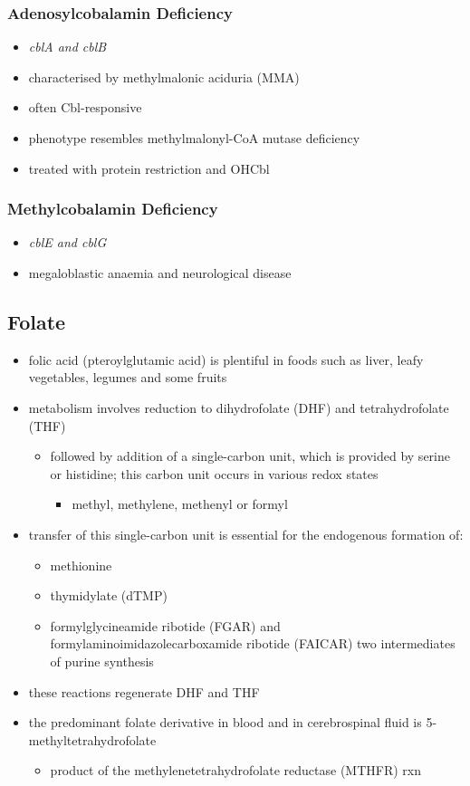 \documentclass{scrartcl}
\begin{document}
\subsubsection{Adenosylcobalamin Deficiency}
\label{sec:org4a7ae16}
\begin{itemize}
\item \emph{cblA and cblB}
\item characterised by methylmalonic aciduria (MMA)
\item often Cbl-responsive
\item phenotype resembles methylmalonyl-CoA mutase deficiency
\item treated with protein restriction and OHCbl
\end{itemize}

\subsubsection{Methylcobalamin Deficiency}
\label{sec:org6882b71}
\begin{itemize}
\item \emph{cblE and cblG}
\item megaloblastic anaemia and neurological disease
\end{itemize}
\subsection{Folate}
\label{sec:org0969b9c}
\begin{itemize}
\item folic acid (pteroylglutamic acid) is plentiful in foods such as
liver, leafy vegetables, legumes and some fruits
\item metabolism involves reduction to dihydrofolate (DHF) and
tetrahydrofolate (THF)
\begin{itemize}
\item followed by addition of a single-carbon unit, which is provided by
serine or histidine; this carbon unit occurs in various redox
states
\begin{itemize}
\item methyl, methylene, methenyl or formyl
\end{itemize}
\end{itemize}
\item transfer of this single-carbon unit is essential for the endogenous
formation of:
\begin{itemize}
\item methionine
\item thymidylate (dTMP)
\item formylglycineamide ribotide (FGAR) and
formylaminoimidazolecarboxamide ribotide (FAICAR) two
intermediates of purine synthesis
\end{itemize}
\item these reactions regenerate DHF and THF
\item the predominant folate derivative in blood and in cerebrospinal
fluid is 5-methyltetrahydrofolate
\begin{itemize}
\item product of the methylenetetrahydrofolate reductase (MTHFR) rxn
\end{itemize}
\end{itemize}
\end{document}
